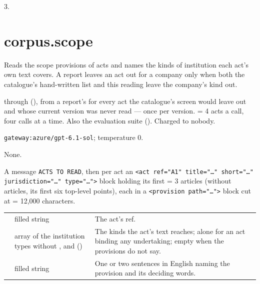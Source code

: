  3.


\section{corpus.scope}\label{sec:aprompts:corpus-scope}

 Reads the scope provisions of acts and names the kinds of
institution each act's own text covers. A report leaves an act out for a company only when
both the catalogue's hand-written list and this reading leave the company's kind out.

  through 
(), from a report's  for every act the
catalogue's screen would leave out and whose current version was never read --- once per
version.  = 4 acts a call, four calls at a time. Also the evaluation
suite  (). Charged to nobody.

 \texttt{gateway:azure/gpt-6.1-sol}; temperature 0.

 None.

 A message \texttt{ACTS TO READ}, then per act an
\texttt{<act ref="A1" title="…" short="…" jurisdiction="…" type="…">} block holding its first
 = 3 articles (without articles, its first six top-level points), each in
a \texttt{<provision path="…">} block cut at  = 12{,}000 characters.

\par\nopagebreak
\begin{xltabular}{\textwidth}{@{}L{38mm}L{40mm}Y@{}}
\toprule
{} &  &  \\
\midrule
\endhead
\bottomrule
\endlastfoot
{} & filled string & The act's ref. \\
 & array of the institution types without ,  and  () & The kinds the act's text reaches;  alone for an act binding any undertaking; empty when the provisions do not say. \\
 & filled string & One or two sentences in English naming the provision and its deciding words. \\
\end{xltabular}

